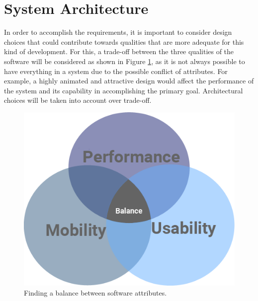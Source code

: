 \section{System Architecture}
In order to accomplish the requirements, it is important to consider design choices that could contribute towards qualities that are more adequate for this kind of development. For this, a trade-off between the three qualities of the software will be considered as shown in Figure \ref{fig:balance_attributes}, as it is not always possible to have everything in a system due to the possible conflict of attributes. For example, a highly animated and attractive design would affect the performance of the system and its capability in accomplishing the primary goal. Architectural choices will be taken into account over trade-off.


\begin{figure}[H]
\begin{adjustbox}{width=.5\textwidth,center=\textwidth}
  \centering
  \includegraphics[scale=1]{images/balanceCircles.png}
\end{adjustbox}
  \caption[Finding a balance between software attributes]{Finding a balance between software attributes.}
  \label{fig:balance_attributes}
\end{figure}

